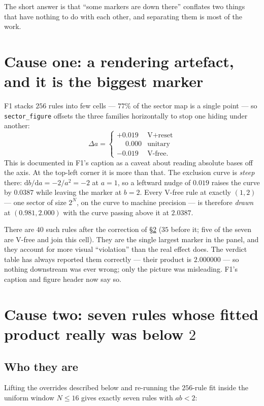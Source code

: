 \documentclass[11pt]{article}
\newcommand{\fn}[1]{\texttt{#1}}
\theoremstyle{plain}
\begin{document}
The short answer is that ``some markers are down there'' conflates two things
that have nothing to do with each other, and separating them is most of the work.

\section{Cause one: a rendering artefact, and it is the biggest marker}
\label{sec:artefact}

F1 stacks $256$ rules into few cells --- $77\%$ of the sector map is a single
point --- so \fn{sector\_figure} offsets the three families horizontally to stop
one hiding under another:
\[
\Delta a = \begin{cases}
+0.019 & \text{V+reset}\\
\phantom{+}0.000 & \text{unitary}\\
-0.019 & \text{V-free.}
\end{cases}
\]
This is documented in F1's caption as a caveat about reading absolute bases off
the axis. At the top-left corner it is more than that. The exclusion curve is
\emph{steep} there: $\mathrm{d}b/\mathrm{d}a=-2/a^2=-2$ at $a=1$, so a leftward
nudge of $0.019$ raises the curve by $0.0387$ while leaving the marker at
$b=2$. Every V-free rule at exactly $(1,2)$ --- one sector of size $2^N$, on the
curve to machine precision --- is therefore \emph{drawn} at $(0.981,2.000)$ with
the curve passing above it at $2.0387$.

There are $40$ such rules after the correction of \S\ref{sec:seven} ($35$ before
it; five of the seven are V-free and join this cell). They are the single largest
marker in the panel, and they account for more visual ``violation'' than the real
effect does. The verdict table has always reported them correctly --- their
product is $2.000000$ --- so nothing downstream was ever wrong; only the picture
was misleading. F1's caption and figure header now say so.

\section{Cause two: seven rules whose fitted product really was below $2$}
\label{sec:seven}

\subsection{Who they are}

Lifting the overrides described below and re-running the $256$-rule fit inside
the uniform window $N\le16$ gives exactly seven rules with $ab<2$:
\end{document}
